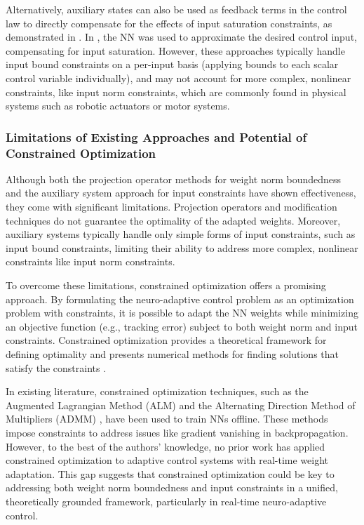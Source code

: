 \documentclass[lettersize,journal]{IEEEtran}
\begin{document}
Alternatively, auxiliary states can also be used as feedback terms in the control law to directly compensate for the effects of input saturation constraints, as demonstrated in \cite{RN34, RN38, RN37}. In \cite{RN41}, the NN was used to approximate the desired control input, compensating for input saturation. However, these approaches typically handle input bound constraints on a per-input basis (\ie applying bounds to each scalar control variable individually), and may not account for more complex, nonlinear constraints, like input norm constraints, which are commonly found in physical systems such as robotic actuators or motor systems.

\subsubsection{Limitations of Existing Approaches and Potential of Constrained Optimization}

Although both the projection operator methods for weight norm boundedness and the auxiliary system approach for input constraints have shown effectiveness, they come with significant limitations. Projection operators and modification techniques do not guarantee the optimality of the adapted weights. Moreover, auxiliary systems typically handle only simple forms of input constraints, such as input bound constraints, limiting their ability to address more complex, nonlinear constraints like input norm constraints.

To overcome these limitations, constrained optimization offers a promising approach. By formulating the neuro-adaptive control problem as an optimization problem with constraints, it is possible to adapt the NN weights while minimizing an objective function (e.g., tracking error) subject to both weight norm and input constraints. Constrained optimization provides a theoretical framework for defining optimality and presents numerical methods for finding solutions that satisfy the constraints \cite{RN22}.

In existing literature, constrained optimization techniques, such as the Augmented Lagrangian Method (ALM) \cite{RN60} and the Alternating Direction Method of Multipliers (ADMM) \cite{RN58, RN59}, have been used to train NNs offline. These methods impose constraints to address issues like gradient vanishing in backpropagation. However, to the best of the authors' knowledge, no prior work has applied constrained optimization to adaptive control systems with real-time weight adaptation. This gap suggests that constrained optimization could be key to addressing both weight norm boundedness and input constraints in a unified, theoretically grounded framework, particularly in real-time neuro-adaptive control.
\end{document}

